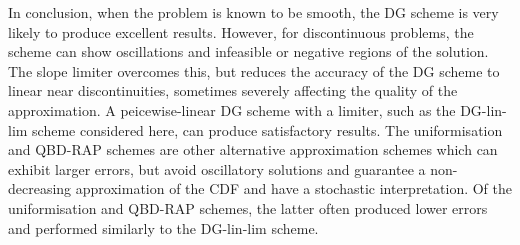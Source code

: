 In conclusion, when the problem is known to be smooth, the DG scheme is very likely to produce excellent results. However, for discontinuous problems, the scheme can show oscillations and infeasible or negative regions of the solution. The slope limiter overcomes this, but reduces the accuracy of the DG scheme to linear near discontinuities, sometimes severely affecting the quality of the approximation. A peicewise-linear DG scheme with a limiter, such as the DG-lin-lim scheme considered here, can produce satisfactory results. The uniformisation and QBD-RAP schemes are other alternative approximation schemes which can exhibit larger errors, but avoid oscillatory solutions and guarantee a non-decreasing approximation of the CDF and have a stochastic interpretation. Of the uniformisation and QBD-RAP schemes, the latter often produced lower errors and performed similarly to the DG-lin-lim scheme. 

